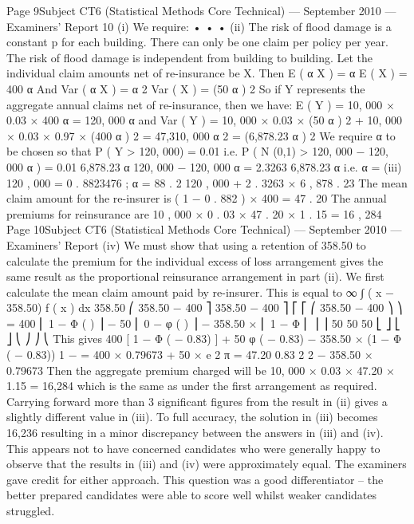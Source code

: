\documentclass[a4paper,12pt]{article}
\begin{document}
Page 9Subject CT6 (Statistical Methods Core Technical) — September 2010 — Examiners’ Report
10
(i)
We require:
•
•
•
(ii)
The risk of flood damage is a constant p for each building.
There can only be one claim per policy per year.
The risk of flood damage is independent from building to building.
Let the individual claim amounts net of re-insurance be X. Then
E ( α X ) = α E ( X ) = 400 α
And Var ( α X ) = α 2 Var ( X ) = (50 α ) 2
So if Y represents the aggregate annual claims net of re-insurance, then we
have:
E ( Y ) = 10, 000 × 0.03 × 400 α = 120, 000 α
and
Var ( Y ) = 10, 000 × 0.03 × (50 α ) 2 + 10, 000 × 0.03 × 0.97 × (400 α ) 2 = 47,310, 000 α 2
= (6,878.23 α ) 2
We require α to be chosen so that
P ( Y > 120, 000) = 0.01
i.e. P ( N (0,1) >
120, 000 − 120, 000 α
) = 0.01
6,878.23 α
120, 000 − 120, 000 α
= 2.3263
6,878.23 α
i.e. α =
(iii)
120 , 000
= 0 . 8823476 ; α = 88 . 2 %
120 , 000 + 2 . 3263 × 6 , 878 . 23
The mean claim amount for the re-insurer is ( 1 − 0 . 882 ) × 400 = 47 . 20
The annual premiums for reinsurance are 10 , 000 × 0 . 03 × 47 . 20 × 1 . 15 = 16 , 284
Page 10Subject CT6 (Statistical Methods Core Technical) — September 2010 — Examiners’ Report
(iv)
We must show that using a retention of 358.50 to calculate the premium for
the individual excess of loss arrangement gives the same result as the
proportional reinsurance arrangement in part (ii).
We first calculate the mean claim amount paid by re-insurer. This is equal to
∞
∫
( x − 358.50) f ( x ) dx
358.50
⎛
358.50 − 400 ⎤
358.50 − 400 ⎤
⎡
⎡
⎛ 358.50 − 400 ⎞ ⎞
= 400 ⎢ 1 − Φ (
) ⎥ − 50 ⎢ 0 − φ (
) ⎥ − 358.50 × ⎜ 1 − Φ ⎜
⎟ ⎟
50
50
50
⎣
⎦
⎣
⎦
⎝
⎠ ⎠
⎝
This gives
400 [ 1 − Φ ( − 0.83) ] + 50 φ ( − 0.83) − 358.50 × (1 − Φ ( − 0.83))
1 −
= 400 × 0.79673 + 50 ×
e
2 π
= 47.20
0.83 2
2
− 358.50 × 0.79673
Then the aggregate premium charged will be 10, 000 × 0.03 × 47.20 × 1.15 =
16,284 which is the same as under the first arrangement as required.
Carrying forward more than 3 significant figures from the result in (ii) gives a slightly
different value in (iii). To full accuracy, the solution in (iii) becomes 16,236 resulting in a
minor discrepancy between the answers in (iii) and (iv). This appears not to have concerned
candidates who were generally happy to observe that the results in (iii) and (iv) were
approximately equal. The examiners gave credit for either approach.
This question was a good differentiator – the better prepared candidates were able to score
well whilst weaker candidates struggled.
\end{document}
